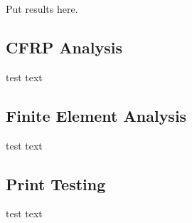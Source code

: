 
Put results here.\\

\subsection*{CFRP Analysis}

test text\\

\subsection*{Finite Element Analysis}

test text\\

\subsection*{Print Testing}

test text\\